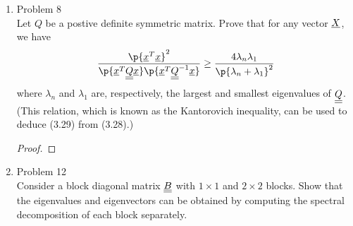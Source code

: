 \documentclass[11pt, oneside]{article}
\begin{document}
\begin{enumerate}
\begin{proof}
    \end{proof}

  \item %
    Problem 8 \\
    Let $Q$ be a postive definite symmetric matrix.
    Prove that for any vector $\underline{X}$, we have
    \[
      \frac{\p{\v{x}^T\v{x}}^2}{\p{\v{x}^T \M{Q} \v{x}}\p{\v{x}^T \M{Q}^{-1} \v{x}}}
      \ge \frac{4\lambda_n \lambda_1}{\p{\lambda_n + \lambda_1}^2}
    \]
    where $\lambda_n$ and $\lambda_1$ are, respectively, the largest and
    smallest eigenvalues of $\underline{\underline{Q}}$.
    (This relation, which is known as the Kantorovich inequality, can be used to
    deduce (3.29) from (3.28).)

    \begin{proof}
      
    \end{proof}

  \item %
    Problem 12 \\
    Consider a block diagonal matrix $\underline{\underline{B}}$ with $1 \times 1$ and $2 \times 2$
    blocks.
    Show that the eigenvalues and eigenvectors can be obtained by computing the
    spectral decomposition of each block separately.


\end{enumerate}
\end{document}
